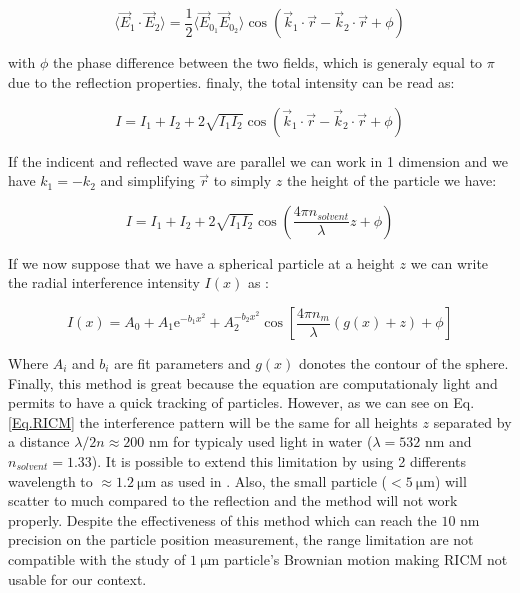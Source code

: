 \begin{equation}
	\langle \vec{E}_1 \cdot \vec{E}_2 \rangle = \frac{1}{2} \langle  \vec{E}_{0_1}  \vec{E}_{0_2} \rangle
	\cos 
	\left(
	\vec{k}_1 \cdot \vec{r} - \vec{k}_2 \cdot \vec{r} + \phi	
	\right)	
\end{equation}

with $\phi$ the phase difference between the two fields, which is generaly equal to $\pi$ due to the reflection properties.  finaly, the total intensity can be read as:


\begin{equation}
	I = I_1 + I_2 + 2 \sqrt{I_1 I_2} 
	\cos 
	\left(
	\vec{k}_1 \cdot \vec{r} - \vec{k}_2 \cdot \vec{r} + \phi	
	\right)
\end{equation}

If the indicent and reflected wave are parallel we can work in 1 dimension and we have $k_1 = - k_2$ and simplifying $\vec{r}$ to simply $z$ the height of the particle we have:


\begin{equation}
	I = I_1 + I_2 + 2 \sqrt{I_1 I_2} 
	\cos 
	\left(
	\frac{4 \pi n_{solvent}}{\lambda} z + \phi	
	\right)
\end{equation}


If we now suppose that we have a spherical particle at a height $z$ we can write the radial interference intensity $I(x)$ as \cite{ raedler_measurement_1992}:

\begin{equation}
	I(x) = A_0 + A_1 \mathrm{e}^{-b_1 x^2} + A_2^{-b_2 x^2} \cos \left[ \frac{4\pi n_m}{\lambda}\left( g(x) + z \right) + \phi \right]
	\label{Eq.RICM}
\end{equation}

Where $A_i$ and $b_i$ are fit parameters and $g(x)$ donotes the contour of the sphere.
Finally, this method is great because the equation are computationaly light and permits to have a quick tracking of particles. However, as we can see on Eq.\ref{Eq.RICM} the interference pattern will be the same for all heights $z$ separated by a distance $\lambda / 2n \approx 200 $ nm for typicaly used light in water ($\lambda = 532$ nm and $n_{solvent} = 1.33$). It is possible to extend this limitation by using 2 differents wavelength to $\approx 1.2 ~ \mathrm{\mu m}$ as used in \cite{davies_elastohydrodynamic_2018}. Also, the small particle ($<5 ~ \mathrm{\mu m}$) will scatter to much compared to the reflection and the method will not work properly.  Despite the effectiveness of this method which can reach the $10$ nm precision on the particle position measurement, the range limitation are not compatible with the study of $ 1 ~ \mathrm{\mu m}$ particle's Brownian motion making \gls{RICM} not usable for our context.



